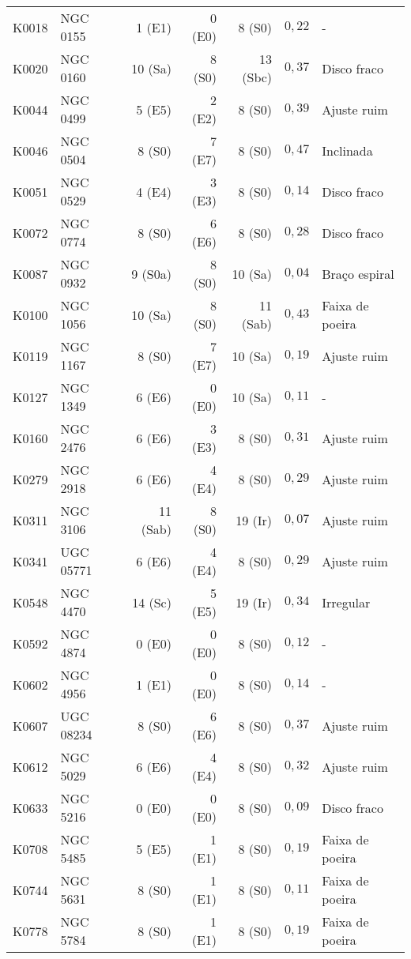 \begin{longtable}{ l l r r r r l }
K0018 & NGC 0155  &  1 (E1)  & 0 (E0) &  8 (S0)  & $0,22$ & - \\
K0020 & NGC 0160  & 10 (Sa)  & 8 (S0) & 13 (Sbc) & $0,37$ & Disco fraco \\
K0044 & NGC 0499  &  5 (E5)  & 2 (E2) &  8 (S0)  & $0,39$ & Ajuste ruim \\
K0046 & NGC 0504  &  8 (S0)  & 7 (E7) &  8 (S0)  & $0,47$ & Inclinada \\
K0051 & NGC 0529  &  4 (E4)  & 3 (E3) &  8 (S0)  & $0,14$ & Disco fraco \\
K0072 & NGC 0774  &  8 (S0)  & 6 (E6) &  8 (S0)  & $0,28$ & Disco fraco \\
K0087 & NGC 0932  &  9 (S0a) & 8 (S0) & 10 (Sa)  & $0,04$ & Braço espiral \\
K0100 & NGC 1056  & 10 (Sa)  & 8 (S0) & 11 (Sab) & $0,43$ & Faixa de poeira \\
K0119 & NGC 1167  &  8 (S0)  & 7 (E7) & 10 (Sa)  & $0,19$ & Ajuste ruim \\
K0127 & NGC 1349  &  6 (E6)  & 0 (E0) & 10 (Sa)  & $0,11$ & - \\
K0160 & NGC 2476  &  6 (E6)  & 3 (E3) &  8 (S0)  & $0,31$ & Ajuste ruim \\
K0279 & NGC 2918  &  6 (E6)  & 4 (E4) &  8 (S0)  & $0,29$ & Ajuste ruim \\
K0311 & NGC 3106  & 11 (Sab) & 8 (S0) & 19 (Ir)  & $0,07$ & Ajuste ruim \\
K0341 & UGC 05771 &  6 (E6)  & 4 (E4) &  8 (S0)  & $0,29$ & Ajuste ruim \\
K0548 & NGC 4470  & 14 (Sc)  & 5 (E5) & 19 (Ir)  & $0,34$ & Irregular \\
K0592 & NGC 4874  &  0 (E0)  & 0 (E0) &  8 (S0)  & $0,12$ & - \\
K0602 & NGC 4956  &  1 (E1)  & 0 (E0) &  8 (S0)  & $0,14$ & - \\
K0607 & UGC 08234 &  8 (S0)  & 6 (E6) &  8 (S0)  & $0,37$ & Ajuste ruim \\
K0612 & NGC 5029  &  6 (E6)  & 4 (E4) &  8 (S0)  & $0,32$ & Ajuste ruim \\
K0633 & NGC 5216  &  0 (E0)  & 0 (E0) &  8 (S0)  & $0,09$ & Disco fraco \\
K0708 & NGC 5485  &  5 (E5)  & 1 (E1) &  8 (S0)  & $0,19$ & Faixa de poeira \\
K0744 & NGC 5631  &  8 (S0)  & 1 (E1) &  8 (S0)  & $0,11$ & Faixa de poeira \\
K0778 & NGC 5784  &  8 (S0)  & 1 (E1) &  8 (S0)  & $0,19$ & Faixa de poeira \\

\end{longtable}
